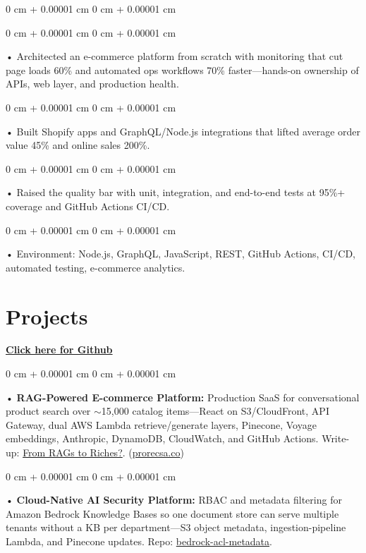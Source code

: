 \documentclass[10pt, letterpaper]{article}
\newenvironment{onecolentry}{
    \begin{adjustwidth}{
        0 cm + 0.00001 cm
    }{
        0 cm + 0.00001 cm
    }
}{
    \end{adjustwidth}
} %
\begin{document}
\begin{onecolentry}
        \begin{onecolentry}
             • Architected an e-commerce platform from scratch with monitoring that cut page loads 60\% and automated ops workflows 70\% faster---hands-on ownership of APIs, web layer, and production health.
        \end{onecolentry}
        \begin{onecolentry}
             • Built Shopify apps and GraphQL/Node.js integrations that lifted average order value 45\% and online sales 200\%.
        \end{onecolentry}
        \begin{onecolentry}
             • Raised the quality bar with unit, integration, and end-to-end tests at 95\%+ coverage and GitHub Actions CI/CD.
        \end{onecolentry}

        \begin{onecolentry}
             • Environment: Node.js, GraphQL, JavaScript, REST, GitHub Actions, CI/CD, automated testing, e-commerce analytics.
        \end{onecolentry}
             \vspace{2 pt }

        \vspace{0.4cm}
        \vspace{0.4cm}
\section{Projects}
    \vspace{2 pt}
\end{onecolentry}
\textbf{\href{https://github.com/daedalus-s}{Click here for Github}}
\begin{onecolentry}
     • \textbf{RAG-Powered E-commerce Platform:} Production SaaS for conversational product search over $\sim$15,000 catalog items---React on S3/CloudFront, API Gateway, dual AWS Lambda retrieve/generate layers, Pinecone, Voyage embeddings, Anthropic, DynamoDB, CloudWatch, and GitHub Actions. Write-up: \href{https://medium.com/@sreenikethaathreya/from-rags-to-riches-bba8a671d5e6}{From RAGs to Riches?}. (\href{https://prorecsa.co}{prorecsa.co})
\end{onecolentry}
\begin{onecolentry}
     • \textbf{Cloud-Native AI Security Platform:} RBAC and metadata filtering for Amazon Bedrock Knowledge Bases so one document store can serve multiple tenants without a KB per department---S3 object metadata, ingestion-pipeline Lambda, and Pinecone updates. Repo: \href{https://github.com/daedalus-s/bedrock-acl-metadata}{bedrock-acl-metadata}.
\end{onecolentry}
\end{document}
